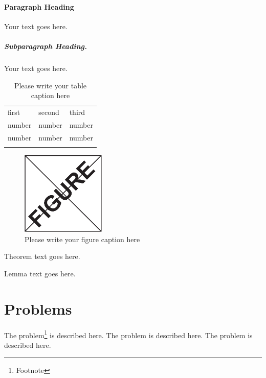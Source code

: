 \paragraph{Paragraph Heading} %
Your text goes here.

\subparagraph{Subparagraph Heading.} Your text goes here.%
%
%
%
\begin{table}
	\centering
	\caption{Please write your table caption here}
	\label{tab:1}       %
	\begin{tabular}{lll}
		\hline\noalign{\smallskip}
		first & second & third  \\
		\noalign{\smallskip}\hline\noalign{\smallskip}
		number & number & number \\
		number & number & number \\
		\noalign{\smallskip}\hline
	\end{tabular}
\end{table}
%
%
%
\begin{figure}
	\centering
	\includegraphics[height=4cm]{figure}
	\caption{Please write your figure caption here}
	\label{fig:1}       %
\end{figure}
%
%
\begin{theorem}
	Theorem text goes here.
\end{theorem}
%
%
\begin{lemma}
	Lemma text goes here.
\end{lemma}
%
%
\section*{Problems}
%
\begin{prob}
	\label{prob1}
	The problem\footnote{Footnote} is described here. The
	problem is described here. The problem is described here.
\end{prob}

